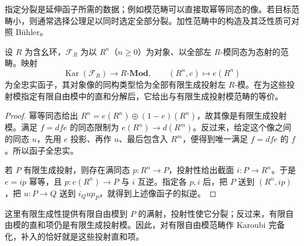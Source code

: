 指定分裂是延伸函子所需的数据；例如模范畴可以直接取幂等同态的像。若目标范畴小，则通常选择公理足以同时选定全部分裂。加性范畴中的构造及其泛性质可对照 Bühler\cite[Section 6, Proposition 6.10, Corollary 6.11 and Example 6.12]{Buehler2010ExactCategories}。

\begin{proposition}\label{b4:prop:karoubi-free-projective}
	设 \(R\) 为含幺环，\(\mathcal F_R\) 为以 \(R^n\)（\(n\ge0\)）为对象、以全部左 \(R\)-模同态为态射的范畴。映射
	\[
		\operatorname{Kar}(\mathcal F_R)\longrightarrow R\text{-}\mathbf{Mod}, \qquad (R^n,e)\longmapsto e(R^n)
	\]
	为全忠实函子，其对象像的同构类型恰为全部有限生成投射左 \(R\)-模。在为这些投射模指定有限自由模中的直和分解后，它给出与有限生成投射模范畴的等价。
\end{proposition}
\begin{proof}
	幂等同态给出 \(R^n=e(R^n)\oplus(1-e)(R^n)\)，故其像是有限生成投射模。满足 \(f=dfe\) 的同态限制为 \(e(R^n)\to d(R^m)\)。反过来，给定这个像之间的同态 \(u\)，先用 \(e\) 投影、再作 \(u\)、最后包含入 \(R^m\)，便得到唯一满足 \(f=dfe\) 的 \(f\)。所以函子全忠实。

	若 \(P\) 有限生成投射，则存在满同态 \(p:R^n\to P\)，投射性给出截面 \(i:P\to R^n\)。于是 \(e=ip\) 幂等，且 \(p:e(R^n)\to P\) 与 \(i\) 互逆。指定各 \(p,i\) 后，把 \(P\) 送到 \((R^n,ip)\)，把 \(u:P\to Q\) 送到 \(i_Qu p_P\)，就得到上述像函子的拟逆。
\end{proof}

这里有限生成性提供有限自由模到 \(P\) 的满射，投射性使它分裂；反过来，有限自由模的直和项仍是有限生成投射模。因此，对有限自由模范畴作 Karoubi 完备化，补入的恰好就是这些投射直和项。
